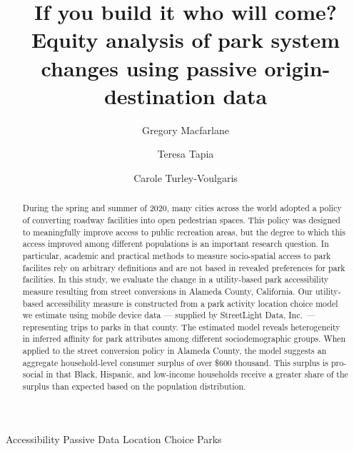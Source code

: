 \documentclass[3p, authoryear, review]{elsarticle} %
\begin{document}
\begin{frontmatter}

  \title{If you build it who will come? Equity analysis of park system changes using passive origin-destination data}
    \author[BYU]{Gregory Macfarlane}
    \author[StreetLight]{Teresa Tapia}
    \author[Harvard]{Carole Turley-Voulgaris}
      \address[BYU]{Brigham Young University, Civil and Environmental Engineering Department, 430 Engineering Building, Provo, Utah 84602}
    \address[Harvard]{Harvard Graduate School of Design, 48 Quincy St, Cambridge, Massachussetts 02138}
    \address[StreetLight]{StreetLight Data, Inc., San Francisco, California}
  
  \begin{abstract}
  During the spring and summer of 2020, many cities across the world adopted a
  policy of converting roadway facilities into open pedestrian spaces. This
  policy was designed to meaningfully improve access to public recreation areas,
  but the degree to which this access improved among different populations is an
  important research question. In particular, academic and practical methods
  to measure socio-spatial access to park facilites rely on arbitrary definitions
  and are not based in revealed preferences for park facilities. In this study,
  we evaluate the change in a utility-based park accessibility measure resulting
  from street conversions in Alameda County, California. Our utility-based
  accessibility measure is constructed from a park activity location choice model
  we estimate using mobile device data --- supplied by StreetLight Data, Inc.~---
  representing trips to parks in that county. The estimated model reveals
  heterogeneity in inferred affinity for park attributes among different
  sociodemographic groups. When applied to the street conversion policy in
  Alameda County, the model suggests an aggregate household-level consumer surplus
  of over \$600 thousand. This surplus is pro-social
  in that Black, Hispanic, and low-income households receive a greater share of the
  surplus than expected based on the population distribution.
  \end{abstract}
   \begin{keyword} Accessibility Passive Data Location Choice Parks\end{keyword}
 \end{frontmatter}
\end{document}
